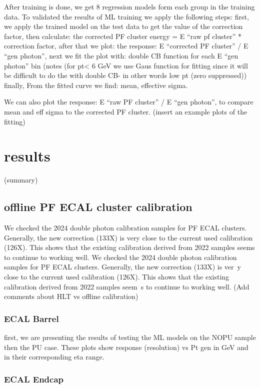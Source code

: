 After training is done, we get 8 regression models form each group in the training data. To validated the results of ML training we apply the following steps: 
first, we apply the trained model on the test data to get the value of the correction factor, 
then calculate:  the corrected PF cluster energy = E “raw pf cluster” * correction factor, 
after that we plot: the response: E “corrected PF cluster” / E “gen photon”, 
next we fit the plot with: double CB function for each E “gen photon” bin (notes (for pt< 6 GeV we use Gaus function for fitting since it will be difficult to do the with double CB- in other words low pt (zero suppressed)) 
finally, From the fitted curve we find: mean, effective sigma.  

We can also plot the response: E “raw PF cluster” / E “gen photon”, to compare mean and eff sigma to the corrected PF cluster. (insert an example plots of the fitting)   
\section{results}
(summary)

\subsection{offline PF ECAL cluster calibration}
We checked the 2024 double photon calibration samples for PF ECAL clusters. Generally, the new correction (133X) is very close to the current used calibration (126X).
This shows that the existing calibration derived from 2022 samples seems to continue to working well.
We checked the 2024 double photon calibration samples for PF ECAL clusters. Generally, the new correction (133X) is ver\
y close to the current used calibration (126X). This shows that the existing calibration derived from 2022 samples seem\
s to continue to working well. (Add comments about HLT vs offline calibration)

\subsubsection{ECAL Barrel}
first, we are presenting the results of testing the ML models on the NOPU sample then the PU case.
These plots show response (resolution) vs Pt gen in GeV and in their corresponding eta range.





\subsubsection{ECAL Endcap}

